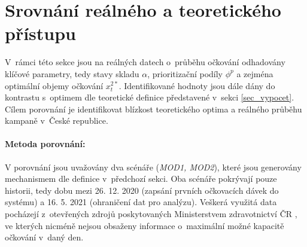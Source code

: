 %

\section*{Srovnání reálného a teoretického přístupu}

%
V~rámci této sekce jsou na reálných datech o~průběhu očkování odhadovány klíčové parametry, tedy stavy skladu $\alpha$, prioritizační podíly $\phi^{p}$ a zejména optimální objemy očkování $x_{t}^{2*}$. Identifikované hodnoty jsou dále dány do kontrastu s~optimem dle teoretické definice představené v~sekci \ref{sec_vypocet}. 
Cílem porovnání je identifikovat blízkost teoretického optima a reálného průběhu kampaně v~České republice.




\paragraph{Metoda porovnání: }\label{sec:comparison}V porovnání jsou uvažovány dva scénáře (\emph{MOD1, MOD2}), které  jsou generovány mechanismem dle definice v~předchozí sekci. Oba scénáře pokrývají pouze historii, tedy dobu mezi 26. 12. 2020 (zapsání prvních očkovacích dávek do systému) a 16. 5. 2021 (ohraničení dat pro analýzu).
Veškerá využitá data pocházejí z~otevřených zdrojů poskytovaných Ministerstvem zdravotnictví ČR \cite{mzcr_data}, ve kterých nicméně nejsou obsaženy informace o~maximální možné kapacitě očkování v~daný den. 





